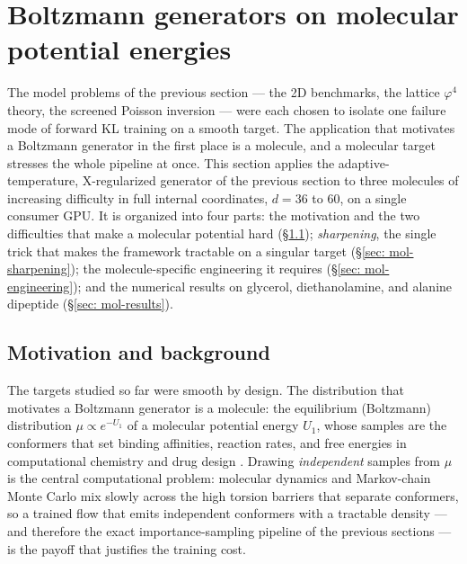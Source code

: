 \documentclass[11pt]{article}
\providecommand{\X}{\mathrm{X}}
\begin{document}
\section{Boltzmann generators on molecular potential energies}
\label{sec: molecular}

The model problems of the previous section --- the 2D benchmarks, the lattice $\varphi^4$ theory, the screened
Poisson inversion --- were each chosen to isolate one failure mode of forward KL training on a smooth target.
The application that motivates a Boltzmann generator in the first place is a molecule, and a molecular target
stresses the whole pipeline at once. This section applies the adaptive-temperature, $\X$-regularized generator
of the previous section to three molecules of increasing difficulty in full internal coordinates,
$d = 36$ to $60$, on a single consumer GPU. It is organized into four parts: the motivation and the two
difficulties that make a molecular potential hard (\S\ref{sec: mol-background}); \emph{sharpening}, the single
trick that makes the framework tractable on a singular target (\S\ref{sec: mol-sharpening}); the
molecule-specific engineering it requires (\S\ref{sec: mol-engineering}); and the numerical results on
glycerol, diethanolamine, and alanine dipeptide (\S\ref{sec: mol-results}).

\subsection{Motivation and background}
\label{sec: mol-background}

The targets studied so far were smooth by design. The distribution that motivates a Boltzmann generator is a
molecule: the equilibrium (Boltzmann) distribution $\mu \propto e^{-U_1}$ of a molecular potential energy
$U_1$, whose samples are the conformers that set binding affinities, reaction rates, and free energies in
computational chemistry and drug design \citep{noe2019boltzmann}. Drawing \emph{independent} samples from
$\mu$ is the central computational problem: molecular dynamics and Markov-chain Monte Carlo mix slowly across
the high torsion barriers that separate conformers, so a trained flow that emits independent conformers with a
tractable density --- and therefore the exact importance-sampling pipeline of the previous sections --- is the
payoff that justifies the training cost.
\end{document}
